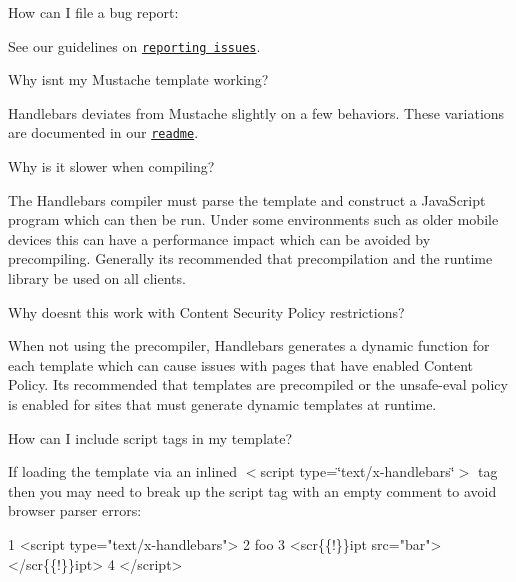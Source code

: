 
\begin{DoxyEnumerate}
\item How can I file a bug report\+:

See our guidelines on \href{https://github.com/wycats/handlebars.js/blob/master/CONTRIBUTING.md#reporting-issues}{\tt reporting issues}.
\end{DoxyEnumerate}
\begin{DoxyEnumerate}
\item Why isn\textquotesingle{}t my Mustache template working?

Handlebars deviates from Mustache slightly on a few behaviors. These variations are documented in our \href{https://github.com/wycats/handlebars.js#differences-between-handlebarsjs-and-mustache}{\tt readme}.
\end{DoxyEnumerate}
\begin{DoxyEnumerate}
\item Why is it slower when compiling?

The Handlebars compiler must parse the template and construct a Java\+Script program which can then be run. Under some environments such as older mobile devices this can have a performance impact which can be avoided by precompiling. Generally it\textquotesingle{}s recommended that precompilation and the runtime library be used on all clients.
\end{DoxyEnumerate}
\begin{DoxyEnumerate}
\item Why doesn\textquotesingle{}t this work with Content Security Policy restrictions?

When not using the precompiler, Handlebars generates a dynamic function for each template which can cause issues with pages that have enabled Content Policy. It\textquotesingle{}s recommended that templates are precompiled or the {\ttfamily unsafe-\/eval} policy is enabled for sites that must generate dynamic templates at runtime.
\end{DoxyEnumerate}
\begin{DoxyEnumerate}
\item How can I include script tags in my template?

If loading the template via an inlined {\ttfamily $<$script type=\char`\"{}text/x-\/handlebars\char`\"{}$>$} tag then you may need to break up the script tag with an empty comment to avoid browser parser errors\+:
\end{DoxyEnumerate}


\begin{DoxyCode}
1 <script type="text/x-handlebars">
2   foo
3   <scr\{\{!\}\}ipt src="bar"></scr\{\{!\}\}ipt>
4 </script>
\end{DoxyCode}


